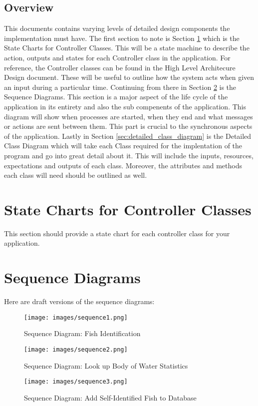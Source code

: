 \documentclass[]{article}
\begin{document}
\subsection{Overview}
\label{sub:overview}

This documents contains varying levels of detailed design components the implementation must have. The first section to note is Section \ref{sec:state_charts_for_controller_classes} which is the State Charts for Controller Classes. This will be a state machine to describe the action, outputs and states for each Controller class in the application. For reference, the Controller classes can be found in the High Level Architecure Design document. These will be useful to outline how the system acts when given an input during a particular time. Continuing from there in Section \ref{sec:sequence_diagrams} is the Sequence Diagrams. This section is a major aspect of the life cycle of the application in its entirety and also the sub compenents of the application. This diagram will show when processes are started, when they end and what messages or actions are sent between them. This part is crucial to the synchronous aspects of the application. Lastly in Section \ref{sec:detailed_class_diagram} is the Detailed Class Diagram which will take each Class required for the implentation of the program and go into great detail about it. This will include the inputs, resources, expectations and outputs of each class. Moreover, the attributes and methods each class will need should be outlined as well.

\section{State Charts for Controller Classes}
\label{sec:state_charts_for_controller_classes}
This section should provide a state chart for each controller class for your application.

\section{Sequence Diagrams}
\label{sec:sequence_diagrams}
Here are draft versions of the sequence diagrams: 
\begin{figure}[H]
	\texttt{[image: images/sequence1.png]}
	\caption{Sequence Diagram: Fish Identification}
\end{figure}
\begin{figure}[H]
	\texttt{[image: images/sequence2.png]}
	\caption{Sequence Diagram: Look up Body of Water Statistics}
\end{figure}
\begin{figure}[H]
	\texttt{[image: images/sequence3.png]}
	\caption{Sequence Diagram: Add Self-Identified Fish to Database}
\end{figure}
\end{document}
